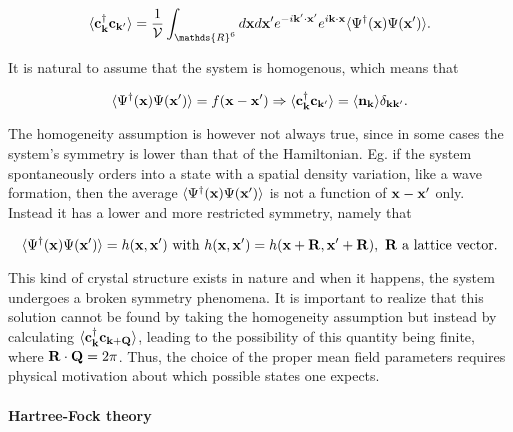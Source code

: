 \documentclass{homework}
\begin{document}
\begin{equation}
    \langle {\bf c}_{{\bf k}}^\dagger {\bf c}_{{\bf k}'} \rangle = \frac{1}{\mathcal{V}} \int_{\mathds{R}^6} d{\bf x} d{\bf x}' e^{-i {\bf k}' \cdot {\bf x}'} e^{i {\bf k} \cdot {\bf x}} \langle \Psi^\dagger({\bf x}) \Psi({\bf x}') \rangle.
\end{equation}

It is natural to assume that the system is homogenous, which means that 

\begin{equation}
    \langle \Psi^\dagger({\bf x}) \Psi({\bf x}') \rangle = f({\bf x} - {\bf x}') \Rightarrow \langle {\bf c}_{{\bf k}}^\dagger {\bf c}_{{\bf k}'} \rangle = \langle {\bf n}_{\bf k} \rangle \delta_{{\bf k}{\bf k}'}.
\end{equation}

The homogeneity assumption is however not always true, since in some cases the system's symmetry is lower than that of the Hamiltonian. Eg. if the system spontaneously orders into a state with a spatial density variation, like a wave formation, then the average $\langle \Psi^\dagger({\bf x}) \Psi({\bf x}') \rangle$ is not a function of ${\bf x} - {\bf x}'$ only. Instead it has a lower and more restricted symmetry, namely that 

$$
    \langle \Psi^\dagger({\bf x}) \Psi({\bf x}') \rangle = h({\bf x}, {\bf x}') \textnormal{ with } h({\bf x}, {\bf x}') = h({\bf x} + {\bf R}, {\bf x}' + {\bf R}), \textnormal{ ${\bf R}$ a lattice vector}.
$$

This kind of crystal structure exists in nature and when it happens, the system undergoes a broken symmetry phenomena. It is important to realize that this solution cannot be found by taking the homogeneity assumption but instead by calculating $ \langle {\bf c}_{{\bf k}}^\dagger {\bf c}_{{\bf k} + {\bf Q}} \rangle$, leading to the possibility of this quantity being finite, where ${\bf R} \cdot {\bf Q} = 2\pi$. Thus, the choice of the proper mean field parameters requires physical motivation about which possible states one expects. 

\paragraph{\textbf{Hartree-Fock theory}}
\end{document}
